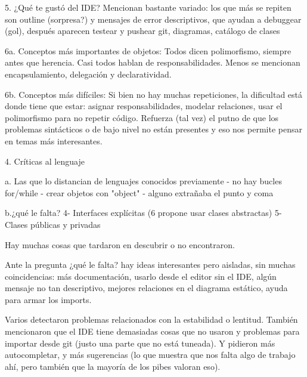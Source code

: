 5. ¿Qué te gustó del IDE?
Mencionan bastante variado: los que más se repiten son outline (sorpresa?) y mensajes de error descriptivos, que ayudan a debuggear (gol), después aparecen testear y pushear git, diagramas, catálogo de clases

6a. Conceptos más importantes de objetos: 
Todos dicen polimorfismo, siempre antes que herencia.
Casi todos hablan de responsabilidades.
Menos se mencionan encapsulamiento, delegación y declaratividad.

6b. Conceptos más difíciles:
Si bien no hay muchas repeticiones, la dificultad está donde tiene que estar: asignar responsabilidades, modelar relaciones, usar el polimorfismo para no repetir código.
Refuerza (tal vez) el putno de que los problemas sintácticos o de bajo nivel no están presentes y eso nos permite pensar en temas más interesantes.





4. Críticas al lenguaje

a. Las que lo distancian de lenguajes conocidos previamente
- no hay bucles for/while
- crear objetos con "object"
- alguno extrañaba el punto y coma

b.¿qué le falta?
  4- Interfaces explícitas (6 propone usar clases abstractas)
  5- Clases públicas y privadas

Hay muchas cosas que tardaron en descubrir o no encontraron.

Ante la pregunta ¿qué le falta? hay ideas interesantes pero aisladas, sin muchas coincidencias: más documentación, usarlo desde el editor sin el IDE, algún mensaje no tan descriptivo, mejores relaciones en el diagrama estático, ayuda para armar los imports.

Varios detectaron problemas relacionados con la estabilidad o lentitud. También mencionaron que el IDE tiene demasiadas cosas que no usaron y problemas para importar desde git (justo una parte que no está tuneada).
Y pidieron más autocompletar, y más sugerencias (lo que muestra que nos falta algo de trabajo ahí, pero también que la mayoría de los pibes valoran eso).
